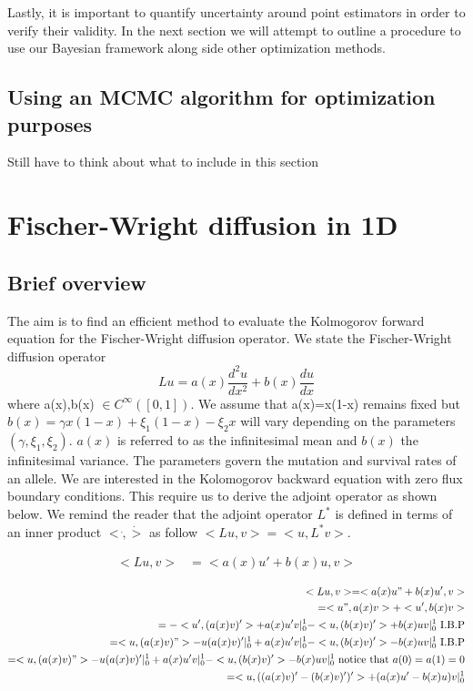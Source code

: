 \documentclass[paper=a4, fontsize=11pt]{scrartcl}
\numberwithin{equation}{section}		%
\numberwithin{figure}{section}			%
\numberwithin{table}{section}				%
\begin{document}
Lastly, it is important to quantify uncertainty around point estimators in order to verify their validity. In the next section we will attempt to outline a procedure to use our Bayesian framework along side other optimization methods.

\section{Using an MCMC algorithm for optimization purposes}
Still have to think about what to include in this section

\chapter{Fischer-Wright diffusion in 1D}
\section{Brief overview}
The aim is to find an efficient method to evaluate the Kolmogorov forward equation for the Fischer-Wright diffusion operator.
We state the Fischer-Wright diffusion operator
\begin{equation}
 Lu = a(x)\frac{d^2u}{dx^2} + b(x)\frac{du}{dx} \label{FW-operator}
\end{equation}
where a(x),b(x) $\in C^\infty([0,1])$. We assume that a(x)=x(1-x) remains fixed but $b(x) = \gamma x(1-x) + \xi_1 (1-x) - \xi_2 x$ will vary depending on the parameters $(\gamma, \xi_1, \xi_2)$. $a(x)$ is referred to as the infinitesimal mean and $b(x)$ the infinitesimal variance. The parameters govern the mutation and survival rates of an allele.
We are interested in the Kolomogorov backward equation with zero flux boundary conditions. This require us to derive the adjoint operator as shown below. We remind the reader that the adjoint operator $L^*$ is defined in terms of an inner product $<\dot,\dot>$ as follow $<Lu,v> = <u,L^*v>$.

\begin{eqnarray}    
<Lu,v> & = <a(x)u' + b(x)u, v> 
\end{eqnarray}

\begin{eqnarray*}    
 <Lu,v> = <a(x)u" + b(x)u', v> \\
        = <u", a(x)v > + <u', b(x)v> \\
		= -<u', (a(x)v)'> + a(x)u'v|^1_0 - <u, (b(x)v)'> + b(x)uv|^1_0 \text{ I.B.P} \\
		= <u, (a(x)v)"> - u(a(x)v)'|^1_0 + a(x)u'v|^1_0 - <u, (b(x)v)'> - b(x)uv|^1_0 \text{ I.B.P} \\
        = <u, (a(x)v)"> - u(a(x)v)'|^1_0 + a(x)u'v|^1_0 - <u, (b(x)v)'> - b(x)uv|^1_0 \text{ notice that $a(0)=a(1)=0$} \\
        = <u, ((a(x)v)'-(b(x)v)')'>  + (a(x)u'- b(x)u)v|^1_0 
\end{eqnarray*}
\end{document}
